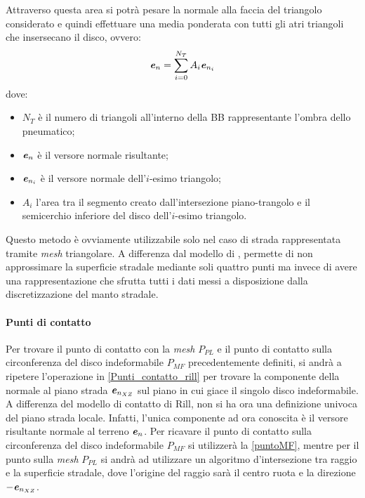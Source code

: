 Attraverso questa area si potrà pesare la normale alla faccia del triangolo considerato e quindi effettuare una media ponderata con tutti gli atri triangoli che insersecano il disco, ovvero:
%
\begin{equation}
\textbf{\textit{e}}_n = \sum_{i=0}^{N_T}A_i\textbf{\textit{e}}_{n_i}
\label{ponderata}
\end{equation}
%
dove:
\begin{itemize}
	\item $N_T$ è il numero di triangoli all'interno della \ac{BB} rappresentante l'ombra dello pneumatico;
	\item $\textbf{\textit{e}}_n$ è il versore normale risultante;
	\item $\textbf{\textit{e}}_{n_i}$ è il versore normale dell'$i$-esimo triangolo;
	\item $A_i$ l'area tra il segmento creato dall'intersezione piano-trangolo e il semicerchio inferiore del disco dell'$i$-esimo triangolo.
\end{itemize}

Questo metodo è ovviamente utilizzabile solo nel caso di strada rappresentata tramite \textit{mesh} triangolare. A differenza dal modello di \cite{Rill}, permette di non approssimare la superficie stradale mediante soli quattro punti ma invece di avere una rappresentazione che sfrutta tutti i dati messi a disposizione dalla discretizzazione del manto stradale.
%
\paragraph{Punti di contatto}
Per trovare il punto di contatto con la \textit{mesh} $P_{PL}$ e il punto di contatto sulla circonferenza del disco indeformabile $P_{MF}$ precedentemente definiti, si andrà a ripetere l'operazione in \ref{Punti_contatto_rill} per trovare la componente della normale al piano strada $\textbf{\textit{e}}_{n_{XZ}}$ sul piano in cui giace il singolo disco indeformabile. A differenza del modello di contatto di Rill, non si ha ora una definizione univoca del piano strada locale. Infatti, l'unica componente ad ora conoscita è il versore risultante normale al terreno $\textbf{\textit{e}}_n$. Per ricavare il punto di contatto sulla circonferenza del disco indeformabile $P_{MF}$ si utilizzerà la \eqref{puntoMF}, mentre per il punto sulla \textit{mesh} $P_{PL}$ si andrà ad utilizzare un algoritmo d'intersezione tra raggio e la superficie stradale, dove l'origine del raggio sarà il centro ruota e la direzione $-\textbf{\textit{e}}_{n_{XZ}}$.
%
